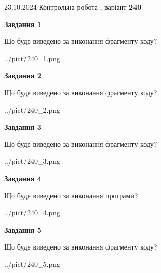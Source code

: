 \documentclass[12pt, ukrainian]{article}
\begin{document}
{\Large{23.10.2024 Контрольна робота , варіант  \No \textbf { 240 }\par}}
{
\begin {large}
{\begin {center}\textbf{Завдання 1}\end {center}}

Що буде виведено за виконання фрагменту коду?\par
\begin{center}
	{../pict/240_1.png}
\end{center}
\newpage

{\begin {center}\textbf{Завдання 2}\end {center}}

Що буде виведено за виконання фрагменту коду?\par
\begin{center}
	{../pict/240_2.png}
\end{center}
\newpage

{\begin {center}\textbf{Завдання 3}\end {center}}

Що буде виведено за виконання фрагменту коду?\par
\begin{center}
	{../pict/240_3.png}
\end{center}
\newpage

{\begin {center}\textbf{Завдання 4}\end {center}}

Що буде виведено за виконання програми?\par
\begin{center}
	{../pict/240_4.png}
\end{center}
\newpage

{\begin {center}\textbf{Завдання 5}\end {center}}

Що буде виведено за виконання фрагменту коду?\par
\begin{center}
	{../pict/240_5.png}
\end{center}
\newpage


\end{large}}
\end{document}
